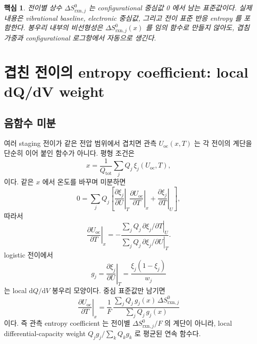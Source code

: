 \documentclass[11pt,a4paper]{article}
\newtheorem*{keybox}{핵심}
\newcommand{\dd}{\mathrm{d}}
\newcommand{\rxn}{\mathrm{rxn}}
\newcommand{\oc}{\mathrm{oc}}
\begin{document}
\begin{keybox}
전이별 상수 $\Delta S_{\rxn,j}^0$ 는 configurational 중심값 0 에서 남는 표준값이다. 실제 내용은
vibrational baseline, electronic 중심값, 그리고 전이 표준 반응 entropy 를 포함한다. 봉우리 내부의
비선형성은 $\Delta S_{\rxn,j}^0(x)$ 를 임의 함수로 만들지 않아도, 겹침 가중과 configurational 로그항에서
자동으로 생긴다.
\end{keybox}

\section{겹친 전이의 entropy coefficient: local dQ/dV weight}
\label{sec:overlap}
\subsection{음함수 미분}
여러 staging 전이가 같은 전압 범위에서 겹치면 관측 $U_\oc(x,T)$ 는 각 전이의 계단을 단순히 이어 붙인
함수가 아니다. 평형 조건은
\begin{equation}
x=\frac{1}{Q_{\mathrm{tot}}}\sum_j Q_j\,\xi_j(U_\oc,T),
\label{eq:implicit_x}
\end{equation}
이다. 같은 $x$ 에서 온도를 바꾸며 미분하면
\begin{equation}
0=\sum_j Q_j\left[
\left.\frac{\partial \xi_j}{\partial U}\right|_T
\left.\frac{\partial U_\oc}{\partial T}\right|_x
+\left.\frac{\partial \xi_j}{\partial T}\right|_U
\right],
\label{eq:implicit_diff}
\end{equation}
따라서
\begin{equation}
\left.\frac{\partial U_\oc}{\partial T}\right|_x
=-\frac{\sum_j Q_j\,\left.\partial \xi_j/\partial T\right|_U}
        {\sum_j Q_j\,\left.\partial \xi_j/\partial U\right|_T}.
\label{eq:dudt_implicit}
\end{equation}
logistic 전이에서
\begin{equation}
g_j=\left.\frac{\partial \xi_j}{\partial U}\right|_T
=\frac{\xi_j(1-\xi_j)}{w_j}
\label{eq:gj}
\end{equation}
는 local $\dd Q/\dd V$ 봉우리 모양이다. 중심 표준값만 남기면
\begin{equation}
\boxed{\;
\left.\frac{\partial U_\oc}{\partial T}\right|_x
=\frac{1}{F}\,
\frac{\sum_j Q_j\,g_j(x)\,\Delta S_{\rxn,j}^0}
     {\sum_j Q_j\,g_j(x)}
\;}
\label{eq:overlap_simple}
\end{equation}
이다. 즉 관측 entropy coefficient 는 전이별 $\Delta S_{\rxn,j}^0/F$ 의 계단이 아니라,
local differential-capacity weight $Q_jg_j/\sum_kQ_kg_k$ 로 평균된 연속 함수다.
\end{document}
